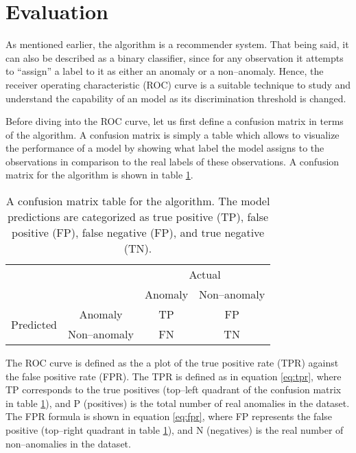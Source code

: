 \section{Evaluation} \label{sect:meth:evaluation}

As mentioned earlier, the \mlblink algorithm is a recommender system. That being said, it can also be described as a binary classifier, since for any observation it attempts to ``assign'' a label to it as either an anomaly or a non--anomaly. Hence, the receiver operating characteristic (ROC) curve is a suitable technique to study and understand the capability of an \mlblink model as its discrimination threshold is changed. \newline

Before diving into the ROC curve, let us first define a confusion matrix in terms of the \mlblink algorithm. A confusion matrix is simply a table which allows to visualize the performance of a model by showing what label the model assigns to the observations in comparison to the real labels of these observations. A confusion matrix for the \mlblink algorithm is shown in table \ref{table:confusion-matrix}.

\begin{table}[H]
    \centering
    \begin{tabular}{cc|cc}
        \multicolumn{2}{c}{}
        & \multicolumn{2}{c}{Actual} \\
        &       &   Anomaly &   Non--anomaly \\ 
        \cline{2-4}
        \multirow{2}{*}{Predicted}
            & Anomaly         & TP   & FP  \\
            & Non--anomaly    & FN   & TN  \\ 
            \cline{2-4}
    \end{tabular}
    \caption{A confusion matrix table for the \mlblink algorithm. The model predictions are categorized as true positive (TP), false positive (FP), false negative (FP), and true negative (TN).}
    \label{table:confusion-matrix}
\end{table}

The ROC curve is defined as the a plot of the true positive rate (TPR) against the false positive rate (FPR). The TPR is defined as in equation \ref{eq:tpr}, where TP corresponds to the true positives (top--left quadrant of the confusion matrix in table \ref{table:confusion-matrix}), and P (positives) is the total number of real anomalies in the dataset. The FPR formula is shown in equation \ref{eq:fpr}, where FP represents the false positive (top--right quadrant in table \ref{table:confusion-matrix}), and N (negatives) is the real number of non--anomalies in the dataset.


